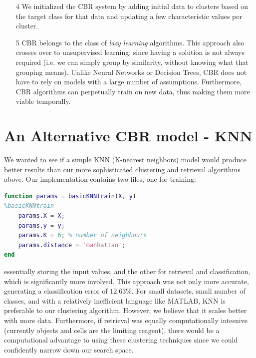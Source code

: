 \documentclass[a4paper,12pt,oneside,final]{report}
\newenvironment{changemargin}[2]{\begin{list}{}{%
\setlength{\topsep}{0pt}%
\setlength{\leftmargin}{0pt}%
\setlength{\rightmargin}{0pt}%
\setlength{\listparindent}{\parindent}%
\setlength{\itemindent}{\parindent}%
\setlength{\parsep}{0pt plus 1pt}%
\addtolength{\leftmargin}{#1}%
\addtolength{\rightmargin}{#2}%
}\item }{\end{list}}
\begin{document}
\begin{itemize}
\begin{itemize}
\end{itemize}
\item[4]  We initialized the CBR system by adding initial data to clusters based on the target class for that data and updating a few characteristic values per cluster.  
\item[5] CBR belongs to the class of \emph{lazy learning} algorithms.  This approach also crosses over to unsupervised learning, since having a solution is not always required (i.e. we can simply group by similarity, without knowing what that grouping means).  Unlike Neural Networks or Decision Trees, CBR does not have to rely on models with a large number of assumptions.  Furthermore, CBR algorithms can perpetually train on new data, thus making them more viable temporally.
\end{itemize}

\chapter{An Alternative CBR model - KNN}
We wanted to see if a simple KNN (K-nearest neighbors) model would produce better results than our more sophisticated clustering and retrieval algorithms above.  Our implementation contains two files, one for training:
\begin{changemargin}{-5mm}{-5mm}
\begin{lstlisting}[language=Matlab, frame=single]
function params = basicKNNtrain(X, y)
%basicKNNtrain
    params.X = X;
    params.y = y;
    params.K = 6; % number of neighbours
    params.distance = 'manhattan';
end
\end{lstlisting}
\end{changemargin}
essentially storing the input values, and the other for retrieval and classification, which is significantly more involved.  This approach was not only more accurate, generating a classification error of $12.63\%$.  For small datasets, small number of classes, and with a relatively inefficient language like MATLAB, KNN is preferable to our clustering algorithm.  However, we believe that it scales better with more data.  Furthermore, if retrieval was equally computationally intesnive (currently objects and cells are the limiting reagent), there would be a computational advantage to using these clustering techniques since we could confidently narrow down our search space.


\end{document}
